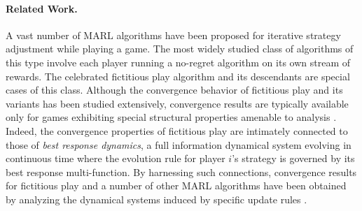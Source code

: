\paragraph{Related Work.} A vast number of MARL algorithms have been proposed for iterative strategy adjustment while playing a game.  The most widely studied class of algorithms of this type involve each player running a no-regret algorithm on its own stream of rewards. The celebrated fictitious play algorithm \cite{brown1951iterative} and its descendants are special cases of this class. Although the convergence behavior of fictitious play and its variants has been studied extensively, convergence results are typically available only for games exhibiting special structural properties amenable to analysis \cite{hofbauer2002global,leslie2006generalised,baudin2022fictitious,sayin2022fictitious-zero,sayin2022fictitious-single}. %
Indeed, the convergence properties of fictitious play are intimately connected to those of \textit{best response dynamics}, a full information dynamical system evolving in continuous time where the evolution rule for player $i$'s strategy is governed by its best response multi-function. By harnessing such connections, convergence results for fictitious play and a number of other MARL algorithms have been obtained by analyzing the dynamical systems induced by specific update rules \cite{benaim2005stochastic,leslie2005individual,swenson2018best}.

